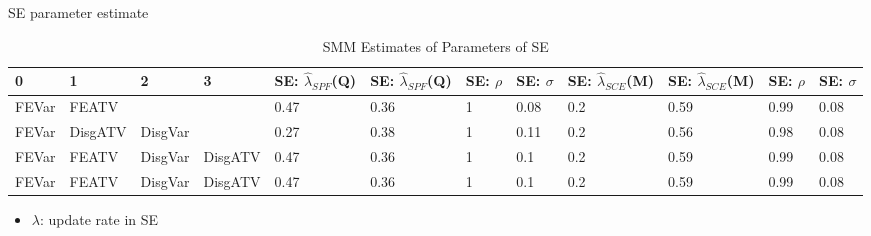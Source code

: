 \documentclass{beamer}
\begin{document}
\begin{frame}{SE parameter estimate}
	\begin{table}
		\centering
		\caption{SMM Estimates of Parameters of SE}
		\label{SMM_Est_SE_Table}
	\begin{tabular}{llllllllllll}
		\hline 
		0     & 1       & 2       & 3       & SE: $\hat\lambda_{SPF}$(Q) & SE: $\hat\lambda_{SPF}$(Q) & SE: $\rho$ & SE: $\sigma$ & SE: $\hat\lambda_{SCE}$(M) & SE: $\hat\lambda_{SCE}$(M) & SE: $\rho$ & SE: $\sigma$ \\
		\hline 
		FEVar & FEATV   &         &         & 0.47                       & 0.36                       & 1          & 0.08         & 0.2                        & 0.59                       & 0.99       & 0.08         \\
		FEVar & DisgATV & DisgVar &         & 0.27                       & 0.38                       & 1          & 0.11         & 0.2                        & 0.56                       & 0.98       & 0.08         \\
		FEVar & FEATV   & DisgVar & DisgATV & 0.47                       & 0.36                       & 1          & 0.1          & 0.2                        & 0.59                       & 0.99       & 0.08         \\
		FEVar & FEATV   & DisgVar & DisgATV & 0.47                       & 0.36                       & 1          & 0.1          & 0.2                        & 0.59                       & 0.99       & 0.08        \\
		\hline 
	\end{tabular}
	\end{table}
\begin{itemize}
	\item $\lambda$: update rate in SE
\end{itemize}
\end{frame}
\end{document}
